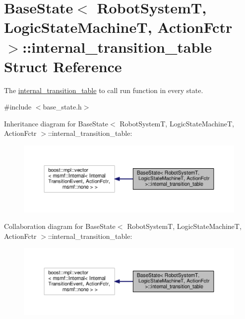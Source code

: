 \hypertarget{structBaseState_1_1internal__transition__table}{\section{Base\-State$<$ Robot\-System\-T, Logic\-State\-Machine\-T, Action\-Fctr $>$\-:\-:internal\-\_\-transition\-\_\-table Struct Reference}
\label{structBaseState_1_1internal__transition__table}
}


The \hyperlink{structBaseState_1_1internal__transition__table}{internal\-\_\-transition\-\_\-table} to call run function in every state.  




{\ttfamily \#include $<$base\-\_\-state.\-h$>$}



Inheritance diagram for Base\-State$<$ Robot\-System\-T, Logic\-State\-Machine\-T, Action\-Fctr $>$\-:\-:internal\-\_\-transition\-\_\-table\-:\nopagebreak
\begin{figure}[H]
\begin{center}
\leavevmode
\includegraphics[width=350pt]{structBaseState_1_1internal__transition__table__inherit__graph}
\end{center}
\end{figure}


Collaboration diagram for Base\-State$<$ Robot\-System\-T, Logic\-State\-Machine\-T, Action\-Fctr $>$\-:\-:internal\-\_\-transition\-\_\-table\-:\nopagebreak
\begin{figure}[H]
\begin{center}
\leavevmode
\includegraphics[width=350pt]{structBaseState_1_1internal__transition__table__coll__graph}
\end{center}
\end{figure}



